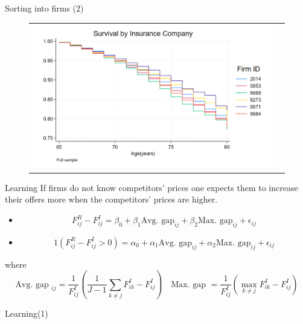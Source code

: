 \documentclass[10pt,aspectratio=169]{beamer}
\begin{document}
\begin{frame}{Sorting into firms (2)}\label{slide:fig3}    
\vspace{-.2cm}
\begin{figure}[H]
\centering{}%
\begin{tabular}{cc}
\includegraphics[scale=0.2964]{../figures/IE6/IE6_survival_year_all.png}
\end{tabular}
\end{figure}
\hyperlink{slide:Descriptive_evidence}{}
\end{frame}


\begin{frame}{Learning} 
    If firms do not know competitors' prices one expects them to increase their offers more when the competitors' prices are higher. 
    \begin{itemize}
        \item $$ F_{ij}^R - F_{ij}^I = \beta_0 + \beta_1 \text{Avg. gap}_{ij} + \beta_2 \text{Max. gap}_{ij} + \epsilon_{ij}$$

        \item $$ 1(F_{ij}^R  - F_{ij}^I > 0)  = \alpha_0 + \alpha_1 \text{Avg. gap}_{ij} + \alpha_2 \text{Max. gap}_{ij} + \epsilon_{ij}$$
    \end{itemize}
    where  $$ \text{Avg. gap }_{ij} = \frac{1}{F_{ij}^I}\left(\frac{1}{J-1}\sum_{k \neq j} F_{ik}^I - F_{ij}^I\right) \quad \text{Max. gap } = \frac{1}{F_{ij}^I}\left(\max_{k \neq j} F_{ik}^I - F_{ij}^I\right)$$
    
\end{frame}


\begin{frame}{Learning(1)}\label{slide:fig4}    
\scalebox{0.8}{
    
}

\hyperlink{slide:Descriptive_evidence}{}
\end{frame}
\end{document}
